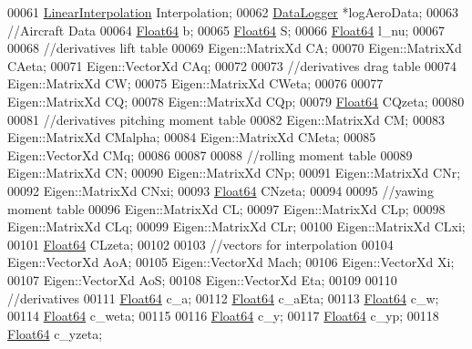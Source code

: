 \begin{DoxyCode}
00061     \hyperlink{class_linear_interpolation}{LinearInterpolation} Interpolation;
00062     \hyperlink{group___tools_class_data_logger}{DataLogger} *logAeroData;
00063     \textcolor{comment}{//Aircraft Data}
00064     \hyperlink{group___tools_ga3f1431cb9f76da10f59246d1d743dc2c}{Float64} b;
00065     \hyperlink{group___tools_ga3f1431cb9f76da10f59246d1d743dc2c}{Float64} S;
00066     \hyperlink{group___tools_ga3f1431cb9f76da10f59246d1d743dc2c}{Float64} l\_nu;
00067     
00068     \textcolor{comment}{//derivatives lift table}
00069     Eigen::MatrixXd CA;
00070     Eigen::MatrixXd CAeta;
00071     Eigen::VectorXd CAq;
00072 
00073     \textcolor{comment}{//derivatives drag table}
00074     Eigen::MatrixXd CW;
00075     Eigen::MatrixXd CWeta;
00076 
00077     Eigen::MatrixXd CQ;
00078     Eigen::MatrixXd CQp;
00079     \hyperlink{group___tools_ga3f1431cb9f76da10f59246d1d743dc2c}{Float64}          CQzeta;
00080 
00081     \textcolor{comment}{//derivatives pitching moment table}
00082     Eigen::MatrixXd CM;
00083     Eigen::MatrixXd CMalpha;
00084     Eigen::MatrixXd CMeta;
00085     Eigen::VectorXd CMq;
00086 
00087 
00088     \textcolor{comment}{//rolling moment table}
00089     Eigen::MatrixXd CN;
00090     Eigen::MatrixXd CNp;
00091     Eigen::MatrixXd CNr;
00092     Eigen::MatrixXd CNxi;
00093     \hyperlink{group___tools_ga3f1431cb9f76da10f59246d1d743dc2c}{Float64} CNzeta;
00094 
00095     \textcolor{comment}{//yawing moment table}
00096     Eigen::MatrixXd CL;
00097     Eigen::MatrixXd CLp;
00098     Eigen::MatrixXd CLq;
00099     Eigen::MatrixXd CLr;
00100     Eigen::MatrixXd CLxi;
00101     \hyperlink{group___tools_ga3f1431cb9f76da10f59246d1d743dc2c}{Float64} CLzeta;
00102 
00103     \textcolor{comment}{//vectors for interpolation }
00104     Eigen::VectorXd AoA;
00105     Eigen::VectorXd Mach;
00106     Eigen::VectorXd Xi;
00107     Eigen::VectorXd AoS;
00108     Eigen::VectorXd Eta;
00109     
00110     \textcolor{comment}{//derivatives}
00111     \hyperlink{group___tools_ga3f1431cb9f76da10f59246d1d743dc2c}{Float64} c\_a;     
00112     \hyperlink{group___tools_ga3f1431cb9f76da10f59246d1d743dc2c}{Float64} c\_aEta; 
00113     \hyperlink{group___tools_ga3f1431cb9f76da10f59246d1d743dc2c}{Float64} c\_w; 
00114     \hyperlink{group___tools_ga3f1431cb9f76da10f59246d1d743dc2c}{Float64} c\_weta;
00115 
00116     \hyperlink{group___tools_ga3f1431cb9f76da10f59246d1d743dc2c}{Float64} c\_y;
00117     \hyperlink{group___tools_ga3f1431cb9f76da10f59246d1d743dc2c}{Float64} c\_yp;
00118     \hyperlink{group___tools_ga3f1431cb9f76da10f59246d1d743dc2c}{Float64} c\_yzeta;

\end{DoxyCode}
